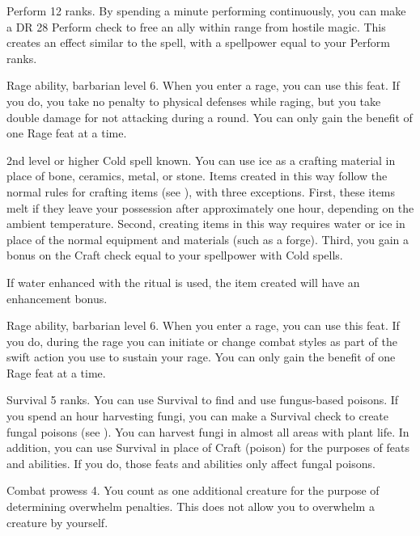 \featpre Perform 12 ranks.
\featben By spending a minute performing continuously, you can make a DR 28 Perform check to free an ally within \rngmed range from hostile magic.
This creates an effect similar to the 
spell, with a spellpower equal to your Perform ranks.

\featpre Rage ability, barbarian level 6.
\featben When you enter a rage, you can use this feat. If you do, you take no penalty to physical defenses while raging, but you take double damage for not attacking during a round.
 You can only gain the benefit of one Rage feat at a time.

\featpre 2nd level or higher Cold spell known.
\featben You can use ice as a crafting material in place of bone, ceramics, metal, or stone.
Items created in this way follow the normal rules for crafting items (see ), with three exceptions.
First, these items melt if they leave your possession after approximately one hour, depending on the ambient temperature.
Second, creating items in this way requires water or ice in place of the normal equipment and materials (such as a forge).
Third, you gain a bonus on the Craft check equal to your spellpower with Cold spells.

If water enhanced with the  ritual is used, the item created will have an enhancement bonus.

\featpre Rage ability, barbarian level 6.
\featben When you enter a rage, you can use this feat. If you do, during the rage you can initiate or change combat styles as part of the swift action you use to sustain your rage.
 You can only gain the benefit of one Rage feat at a time.

\featpre Survival 5 ranks.
\featben You can use Survival to find and use fungus-based poisons.
If you spend an hour harvesting fungi, you can make a Survival check to create fungal poisons (see ).
You can harvest fungi in almost all areas with plant life.
In addition, you can use Survival in place of Craft (poison) for the purposes of feats and abilities.
If you do, those feats and abilities only affect fungal poisons.

\featpre Combat prowess 4.
\featben You count as one additional creature for the purpose of determining overwhelm penalties.
This does not allow you to overwhelm a creature by yourself.

